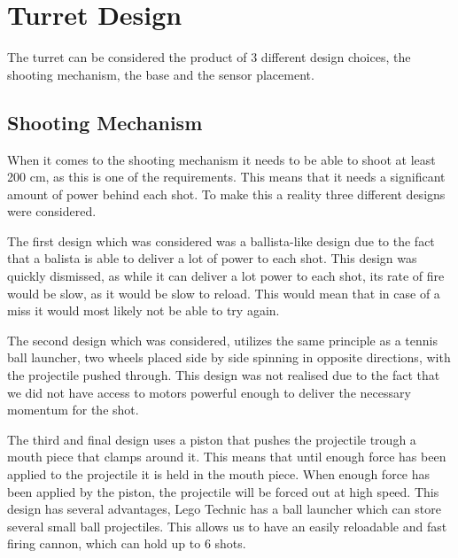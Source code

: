 \section{Turret Design}
The turret can be considered the product of 3 different design choices, the
shooting mechanism, the base and the sensor placement.



\subsection{Shooting Mechanism}
When it comes to the shooting mechanism it needs to be able to shoot at least
200 cm, as this is one of the requirements. This means that it needs a
significant amount of power behind each shot. To make this a reality three
different designs were considered.\nl

The first design which was considered was a ballista-like design due to the fact
that a balista is able to deliver a lot of power to each shot.
This design was quickly dismissed, as while it can deliver a lot power to each
shot, its rate of fire would be slow, as it would be slow to reload. This would
mean that in case of a miss it would most likely not be able to try again.\nl

The second design which was considered, utilizes the same principle as a
tennis ball launcher, two wheels placed side by side spinning in
opposite directions, with the projectile pushed through.
This design was not realised due to the fact that we did not have access to
motors powerful enough to deliver the necessary momentum for the shot.\nl

The third and final design uses a piston that pushes the projectile
trough a mouth piece that clamps around it. This means that until enough force
has been applied to the projectile it is held in the mouth piece. When enough
force has been applied by the piston, the projectile will be forced out at high
speed.
This design has several advantages, Lego Technic has a ball launcher which can
store several small ball projectiles. This allows us to have an easily
reloadable and fast firing cannon, which can hold up to 6 shots.\nl

